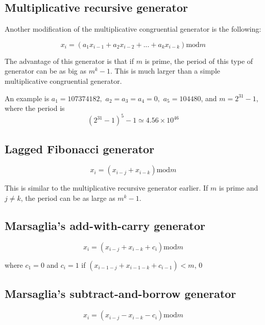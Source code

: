 \documentclass[justified,sixbynine]{tufte-book}
\theoremstyle{plain}%
\theoremstyle{definition}
\theoremstyle{remark}
\begin{document}
\begin{fullwidth}
\goodbreak\subsection{Multiplicative recursive generator}

Another modification of the multiplicative congruential generator is the following:

\begin{equation}
x_i=(a_1x_{i-1}+a_2x_{i-2}+...+a_kx_{i-k})\textrm{mod}m
\end{equation}

The advantage of this generator is that if $m$ is prime, the period of this
type of generator can be as big as $m^k-1$. This is much larger than a
simple multiplicative congruential generator.

An example is $a_1=107374182,$ $a_2=a_3=a_4=0,$ $a_5=104480$, and $m=2^{31}-1$,
where the period is
\begin{equation}
(2^{31}-1)^5-1\simeq 4.56\times 10^{46}
\end{equation}

\goodbreak\subsection{Lagged Fibonacci generator}

\begin{equation}
x_i=(x_{i-j}+x_{i-k})\textrm{mod}m
\end{equation}

This is similar to the multiplicative recursive generator earlier. If $m$ is
prime and $j\neq k$, the period can be as large as $m^k-1$.

\goodbreak\subsection{Marsaglia's add-with-carry generator}

\begin{equation}
x_i=(x_{i-j}+x_{i-k}+c_i)\textrm{mod}m
\end{equation}

where $c_1=0$ and $c_i=1$ if $(x_{i-1-j}+x_{i-1-k}+c_{i-1})<m$, $0$

\goodbreak\subsection{Marsaglia's subtract-and-borrow generator}

\begin{equation}
x_i=(x_{i-j}-x_{i-k}-c_i)\textrm{mod}m
\end{equation}


\end{fullwidth}
\end{document}
